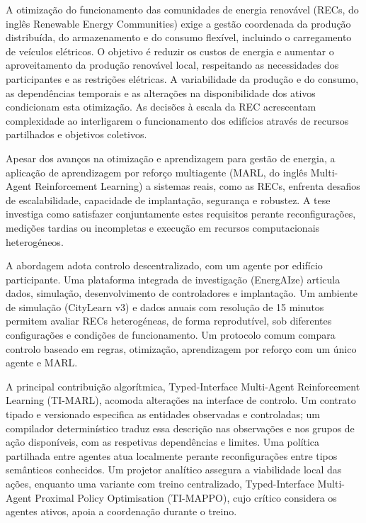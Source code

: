 
A otimização do funcionamento das comunidades de energia renovável (RECs, do inglês Renewable Energy Communities) exige a gestão coordenada da produção distribuída, do armazenamento e do consumo flexível, incluindo o carregamento de veículos elétricos. O objetivo é reduzir os custos de energia e aumentar o aproveitamento da produção renovável local, respeitando as necessidades dos participantes e as restrições elétricas. A variabilidade da produção e do consumo, as dependências temporais e as alterações na disponibilidade dos ativos condicionam esta otimização. As decisões à escala da REC acrescentam complexidade ao interligarem o funcionamento dos edifícios através de recursos partilhados e objetivos coletivos.

Apesar dos avanços na otimização e aprendizagem para gestão de energia, a aplicação de aprendizagem por reforço multiagente (MARL, do inglês Multi-Agent Reinforcement Learning) a sistemas reais, como as RECs, enfrenta desafios de escalabilidade, capacidade de implantação, segurança e robustez. A tese investiga como satisfazer conjuntamente estes requisitos perante reconfigurações, medições tardias ou incompletas e execução em recursos computacionais heterogéneos.

A abordagem adota controlo descentralizado, com um agente por edifício participante. Uma plataforma integrada de investigação (EnergAIze) articula dados, simulação, desenvolvimento de controladores e implantação. Um ambiente de simulação (CityLearn v3) e dados anuais com resolução de 15 minutos permitem avaliar RECs heterogéneas, de forma reprodutível, sob diferentes configurações e condições de funcionamento. Um protocolo comum compara controlo baseado em regras, otimização, aprendizagem por reforço com um único agente e MARL.

A principal contribuição algorítmica, Typed-Interface Multi-Agent Reinforcement Learning (TI-MARL), acomoda alterações na interface de controlo. Um contrato tipado e versionado especifica as entidades observadas e controladas; um compilador determinístico traduz essa descrição nas observações e nos grupos de ação disponíveis, com as respetivas dependências e limites. Uma política partilhada entre agentes atua localmente perante reconfigurações entre tipos semânticos conhecidos. Um projetor analítico assegura a viabilidade local das ações, enquanto uma variante com treino centralizado, Typed-Interface Multi-Agent Proximal Policy Optimisation (TI-MAPPO), cujo crítico considera os agentes ativos, apoia a coordenação durante o treino.

